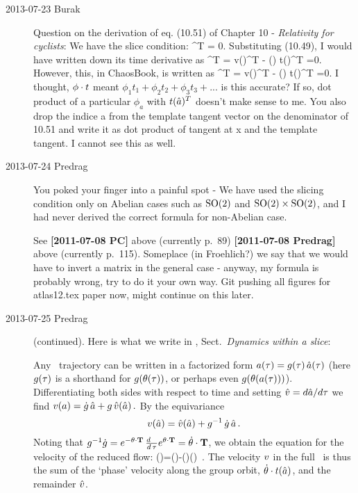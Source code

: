 \begin{description}
\item[2013-07-23  Burak] Question on the derivation of eq. (10.51) of  {Chapter 10} - {\em Relativity for cyclists}: We have the slice condition:
\beq
 \sspRed^T  = 0.
\eeq
Substituting (10.49), I would have written down its time derivative as
\beq
 \velRed^T  = v(\sspRed)^T  - \dot{\phi}(\sspRed) \cdot t(\sspRed)^T =0.
\eeq
However, this, in ChaosBook, is written as
\beq
 \velRed^T  = v(\sspRed)^T  - (\sspRed) \cdot t(\sspRed)^T =0.
\eeq
I thought, $\phi \cdot t$ meant $\phi_1 t_1 + \phi_2 t_2 + \phi_3 t_3 + ... $ is this accurate? If so, dot product of a particular $\phi_a$ with $t(\hat{a})^T$ doesn't make sense to me. You also drop the indice a from the template tangent vector on the denominator of 10.51 and write it as dot product of tangent at x and the template tangent. I cannot see this
as well.

\item[2013-07-24  Predrag]
You poked your finger into a painful spot - We have used the
slicing condition only on Abelian cases such as $\textrm{SO}(2)$ and
$\textrm{SO}(2)\times\textrm{SO}(2)$, and I had never derived the correct formula for
non-Abelian case.

See
{\bf [2011-07-08 PC]} above (currently p.~89)
{\bf [2011-07-08 Predrag]} above (currently p.~115).
Someplace (in Froehlich?) we say that we would have to invert a matrix in
the general case - anyway, my formula is probably wrong, try to do it
your own way. Git pushing all figures for atlas12.tex paper now, might
continue on this later.

\item[2013-07-25  Predrag] (continued). Here is what we write in
, Sect.~{\em Dynamics within a slice}:

Any \statesp\ trajectory can be written in a factorized
form $a(\tau)=g(\tau)\,\hat{a}(\tau)$
(here $g(\tau)$ is a shorthand for $g(\theta(\tau))$,
or perhaps even $g(\theta(a(\tau)))$).
Differentiating both sides with respect to time and
setting $\hat{v}={d\hat{a}}/{d\tau}$ we find
\(
v(a)=\dot{g} \, \hat{a}+g \, \hat{v}(\hat{a})
\,.
\)
By the equivariance %
\[
v(\hat{a})=\hat{v}(\hat{a}) + g^{-1} \, \dot{g} \, \hat{a}
\,.
\]
Noting that $g^{-1}\dot{g}=e^{-\theta \cdot \mathbf{T}} \,
\frac{d ~~}{d \, \tau} e^{\theta \cdot \mathbf{T}}=\dot{\theta}\cdot \mathbf{T}$,
we obtain the equation for the velocity of the reduced flow:
\beq
\velRed(\sspRed)=\vel(\sspRed)-\dot{\gSpace}(\sspRed)\cdot \groupTan(\sspRed)
\,.
The velocity $v$ in the full \statesp\ is thus the sum of the
`phase' velocity %
along the group orbit, $\dot{\theta} \cdot t(\hat{a})$,
and the remainder $\hat{v}$.


\end{description}
